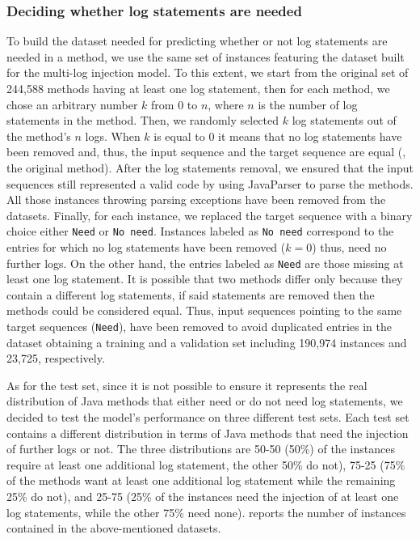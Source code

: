 \subsubsection{Deciding whether log statements are needed}

To build the dataset needed for predicting whether or not log statements are needed in a \java method, we use the same set of instances featuring the dataset built for the multi-log injection model. To this extent, we start from the original set of 244,588 \java methods having at least one log statement, then for each method, we chose an arbitrary number $k$ from 0 to $n$, where $n$ is the number of log statements in the method. Then, we randomly selected $k$ log statements out of the
method's $n$ logs. When $k$ is equal to 0 it means that no log statements have been removed and, thus, the input sequence and the target sequence are equal (\ie, the original \java method). After the log statements removal, we ensured that the input sequences still represented a valid \java code by using JavaParser \cite{javaparser} to parse the methods. All those instances throwing parsing exceptions have been removed from the datasets. 
Finally, for each instance, we replaced the target sequence with a binary choice either \texttt{Need} or \texttt{No need}. Instances labeled as \texttt{No need} correspond to the entries for which no log statements have been removed (\ie $k=0$) thus, need no further logs. On the other hand, the entries labeled as \texttt{Need} are those missing at least one log statement. It is possible that two methods differ only because they contain a different log statements, if said statements are removed then the methods could be considered equal. Thus, input sequences pointing to the same target sequences (\ie \texttt{Need}), have been removed to avoid duplicated entries in the dataset obtaining a training and a validation set including 190,974 instances and 23,725, respectively.

As for the test set, since it is not possible to ensure it represents the real distribution of Java methods that either need or do not need log statements, we decided to test the model's performance on three different test sets. Each test set contains a different distribution in terms of Java methods that need the injection of further logs or not. The three distributions are 50-50 (50\%) of the instances require at least one additional log statement, the other 50\% do not), 75-25 (75\% of the methods want at least one additional log statement while the remaining 25\% do not), and 25-75 (25\% of the instances need the injection of at least one log statements, while the other 75\% need none).
 reports the number of instances contained in the above-mentioned datasets.

